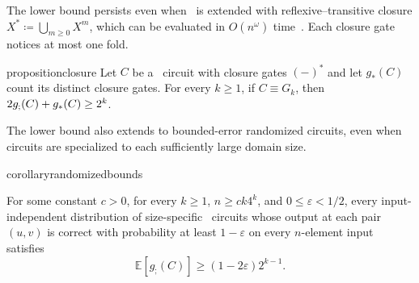 The lower bound persists even when \CoR\ is extended with reflexive–transitive closure 
$X^* \coloneqq \bigcup_{m\ge 0}X^m$,
which can be evaluated in $O(n^\omega)$ time~\citep{fischer-meyer1971,munro1971,furman1970}.
Each closure gate notices at most one fold.


\begin{restatable}{proposition}{closure}\label{prop:star}
Let $C$ be a \CoR\ circuit with closure gates $(-)^*$
and let $g_*(C)$ count its distinct closure gates.
For every $k \ge 1$,
if $C\equiv G_k$, then $2g_{;}(C)+g_*(C)\ge2^k$.
\end{restatable}

The lower bound also extends to bounded-error randomized circuits, even when circuits are specialized to each sufficiently large domain size.

\begin{restatable}{corollary}{randomizedbounds}\label{cor:randomized}

For some constant $c>0$, for every $k\ge 1$, $n\ge ck4^k$, and $0\le\varepsilon<1/2$, every input-independent distribution of size-specific \CoR\ circuits whose output at each pair $(u,v)$ is correct with probability at least $1-\varepsilon$ on every $n$-element input satisfies
\[
\mathbb E[g_{;}(C)]\ge(1-2\varepsilon)2^{k-1}.
\]
\end{restatable}